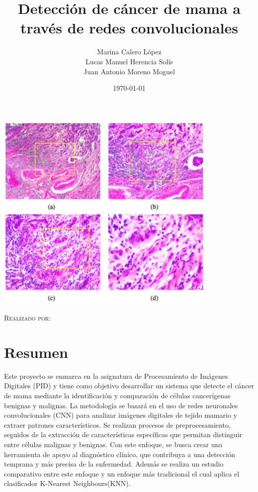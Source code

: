 \documentclass[12pt]{article} %
\title{Detección de cáncer de mama a través de redes convolucionales}
\author{Marina Calero López \\
Lucas Manuel Herencia Solís \\
Juan Antonio Moreno Moguel \\
}
\date{\today}
\newcommand{\customtitlefont}{\fontsize{40pt}{42pt}\selectfont\bfseries} %
\begin{document}
\begin{titlepage}
    \centering
    {\customtitlefont \thetitle \par} %
    \vspace{2cm}
    \includegraphics[width=0.8\textwidth]{logo.png}\par\vspace{1cm} %
    {\scshape\Large Realizado por:\par}
    \vspace{1cm}
    {\Large \theauthor\par}
    \vfill
    {\large \thedate\par}
\end{titlepage}

\section*{Resumen}
Este proyecto se enmarca en la asignatura de Procesamiento de Imágenes Digitales (PID) y tiene como objetivo desarrollar un sistema que detecte el cáncer de mama mediante la identificación y comparación de células cancerígenas benignas y malignas. La metodología se basará en el uso de redes neuronales convolucionales (CNN) para analizar imágenes digitales de tejido mamario y extraer patrones característicos. Se realizan procesos de preprocesamiento, seguidos de la extracción de características específicas que permitan distinguir entre células malignas y benignas. Con este enfoque, se busca crear una herramienta de apoyo al diagnóstico clínico, que contribuya a una detección temprana y más precisa de la enfermedad. Además se realiza un estudio comparativo entre este enfoque y un enfoque más tradicional el cual aplica el clasificador K-Nearest Neighbours(KNN).
\end{document}
